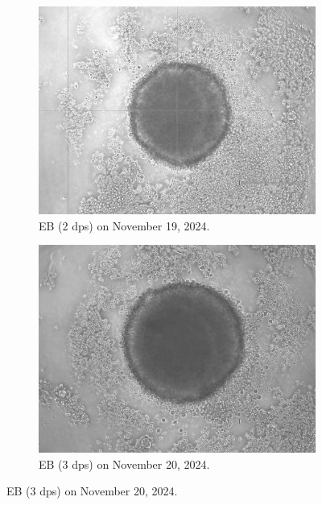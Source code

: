 \documentclass[11pt]{article}
\begin{document}
\begin{figure}[H]
    \centering
    \begin{subfigure}[b]{0.35\textwidth}
        \centering
        \includegraphics[width=\textwidth]{Sandra_eb_PSC2.jpeg}
        \caption{EB (2 dps) on November 19, 2024.}
        \label{fig:Sandra_eb_PSC2}
    \end{subfigure}
    \hfill
    \begin{subfigure}[b]{0.35\textwidth}
        \centering
        \includegraphics[width=\textwidth]{Sandra_PSC2-20.jpeg}
        \caption{EB (3 dps) on November 20, 2024.}
        \label{fig:Sandra_PSC2-20}
    \end{subfigure}


\end{figure}
\end{document}
